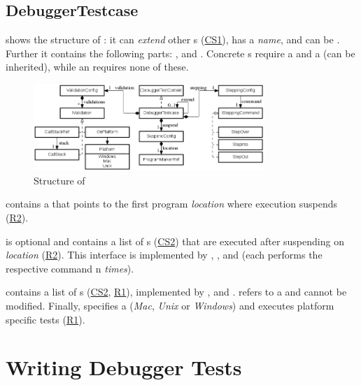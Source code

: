 \subsection{DebuggerTestcase}

 shows the structure of
:
it can \emph{extend} other s (\hyperref[CS1]{CS1}),
has a \emph{name}, and can be . Further it contains the following
parts: ,  and
. Concrete s require  
a  and a  (can be inherited),
while an   requires none of these.
 
\begin{figure}[h]
	\vspace{-3mm}
	\centering
    \includegraphics[width=8.7cm]{./figures/graph4-3.png} 
    \vspace{-3mm}
	\caption{Structure of }
	\label{fig:DebuggerTestcaseStructure}
	\vspace{-2mm}
\end{figure}

 contains a  that points to the first
program \emph{location} where execution suspends (\hyperref[R2]{R2}). 

 is optional and contains a
list of s (\hyperref[CS2]{CS2}) that are executed after
suspending on \emph{location} (\hyperref[R2]{R2}). This interface is implemented by 
, , and  (each performs the
respective command n \emph{times}).

 contains a list of s
(\hyperref[CS2]{CS2}, \hyperref[R1]{R1}), implemented by
,  and .
 refers to a  and cannot
be modified. Finally,  specifies a 
(\emph{Mac}, \emph{Unix} or \emph{Windows}) and executes 
platform specific tests (\hyperref[R1]{R1}).

\section{Writing Debugger Tests}


